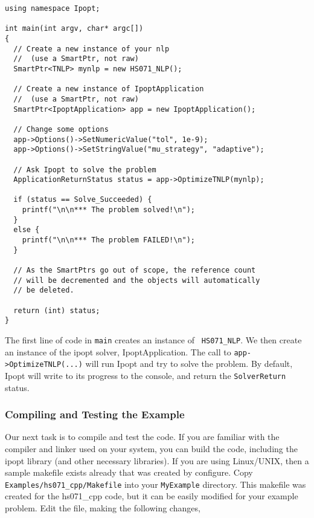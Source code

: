 \documentclass[letter,10pt]{article}
\begin{document}
{\begin{verbatim}
using namespace Ipopt;

int main(int argv, char* argc[])
{
  // Create a new instance of your nlp 
  //  (use a SmartPtr, not raw)
  SmartPtr<TNLP> mynlp = new HS071_NLP();

  // Create a new instance of IpoptApplication
  //  (use a SmartPtr, not raw)
  SmartPtr<IpoptApplication> app = new IpoptApplication();

  // Change some options
  app->Options()->SetNumericValue("tol", 1e-9);
  app->Options()->SetStringValue("mu_strategy", "adaptive");

  // Ask Ipopt to solve the problem
  ApplicationReturnStatus status = app->OptimizeTNLP(mynlp);

  if (status == Solve_Succeeded) {
    printf("\n\n*** The problem solved!\n");
  }
  else {
    printf("\n\n*** The problem FAILED!\n");
  }

  // As the SmartPtrs go out of scope, the reference count
  // will be decremented and the objects will automatically 
  // be deleted.

  return (int) status;
}
\end{verbatim} 

The first line of code in {\tt main} creates an instance of {\tt
HS071\_NLP}. We then create an instance of the ipopt solver,
IpoptApplication. The call to {\tt app->OptimizeTNLP(...)} will run
Ipopt and try to solve the problem. By default, Ipopt will write to
its progress to the console, and return the {\tt SolverReturn} status.

\subsubsection{Compiling and Testing the Example}
Our next task is to compile and test the code. If you are familiar
with the compiler and linker used on your system, you can build the
code, including the ipopt library (and other necessary libraries).  If
you are using Linux/UNIX, then a sample makefile exists already that was
created by configure. Copy {\tt Examples/hs071\_cpp/Makefile} into
your {\tt MyExample} directory. This makefile was created for the
hs071\_cpp code, but it can be easily modified for your example
problem. Edit the file, making the following changes,

}
\end{document}
